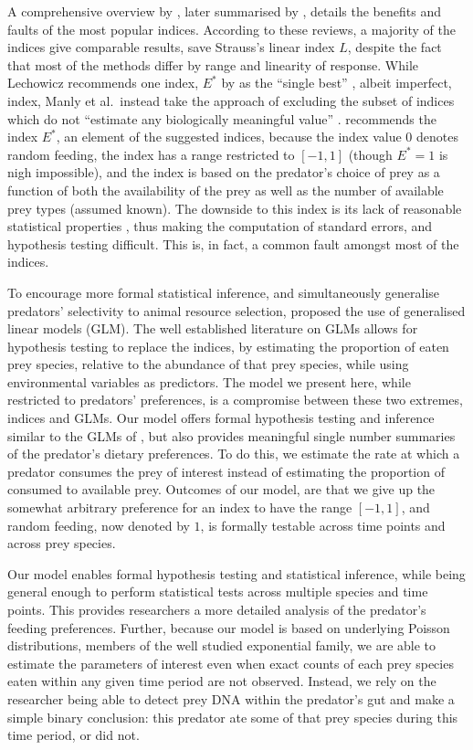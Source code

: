 \documentclass[12pt]{article}
\begin{document}
A comprehensive overview by \citet{Lechowicz:1982}, later summarised by \citet{Manly:1992}, details the benefits and faults of the most popular indices.  According to these reviews, a majority of the indices give comparable results, save Strauss's linear index $L$, despite the fact that most of the methods differ by range and linearity of response.  While Lechowicz recommends one index, $E^*$ by \citet{Vanderploeg:1979} as the ``single best'' \citep{Lechowicz:1982}, albeit imperfect, index, Manly et al.\ instead take the approach of excluding the subset of indices which do not ``estimate any biologically meaningful value'' \citep{Manly:1992}.  \citet{Lechowicz:1982} recommends the index $E^*$, an element of the \citet{Manly:1992} suggested indices, because the index value $0$ denotes random feeding, the index has a range restricted to $[-1,1]$ (though $E^*=1$ is nigh impossible), and the index is based on the predator's choice of prey as a function of both the availability of the prey as well as the number of available prey types (assumed known).  The downside to this index is its lack of reasonable statistical properties \citep{Lechowicz:1982}, thus making the computation of standard errors, and hypothesis testing difficult.  This is, in fact, a common fault amongst most of the indices.  

To encourage more formal statistical inference, and simultaneously generalise predators' selectivity to animal resource selection, \citet{Manly:1992} proposed the use of generalised linear models (GLM).  The well established literature on GLMs allows for hypothesis testing to replace the indices, by estimating the proportion of eaten prey species, relative to the abundance of that prey species, while using environmental variables as predictors.  The model we present here, while restricted to predators' preferences, is a compromise between these two extremes, indices and GLMs.  Our model offers formal hypothesis testing and inference similar to the GLMs of \citet{Manly:1992}, but also provides meaningful single number summaries of the predator's dietary preferences.  To do this, we estimate the rate at which a predator consumes the prey of interest instead of estimating the proportion of consumed to available prey.  Outcomes of our model, are that we give up the somewhat arbitrary preference for an index to have the range $[-1,1]$, and random feeding, now denoted by $1$, is formally testable across time points and across prey species.

Our model enables formal hypothesis testing and statistical inference, while being general enough to perform statistical tests across multiple species and time points.  This provides researchers a more detailed analysis of the predator's feeding preferences.  Further, because our model is based on underlying Poisson distributions, members of the well studied exponential family, we are able to estimate the parameters of interest even when exact counts of each prey species eaten within any given time period are not observed.  Instead, we rely on the researcher being able to detect prey DNA within the predator's gut \citep{Schmidt:2014,Raso:2014,Madduppa:2014} and make a simple binary conclusion: this predator ate some of that prey species during this time period, or did not.  
\end{document}
